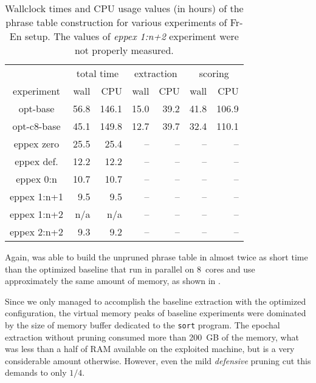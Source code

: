 \begin{table}[ht]
\centering
\begin{tabular}{ | c | r r | r r | r r | }
\hline
 & \multicolumn{2}{|c|}{total time} & \multicolumn{2}{|c|}{extraction} & \multicolumn{2}{|c|}{scoring} \\
experiment & wall & CPU & wall & CPU & wall & CPU \\
\hline
\hline
opt-base      & 56.8 & 146.1 & 15.0 & 39.2 & 41.8 & 106.9 \\
opt-c8-base   & 45.1 & 149.8 & 12.7 & 39.7 & 32.4 & 110.1 \\
eppex zero    & 25.5 &  25.4 & -- & -- & -- & -- \\
\hline
eppex def.    & 12.2 & 12.2 & -- & -- & -- & -- \\
eppex 0:n     & 10.7 & 10.7 & -- & -- & -- & -- \\
eppex 1:n+1   & 9.5 & 9.5 & -- & -- & -- & -- \\
eppex 1:n+2   & n/a & n/a & -- & -- & -- & -- \\
eppex 2:n+2   & 9.3 & 9.2 & -- & -- & -- & -- \\
\hline
\end{tabular}
\caption{\label{fr-en-time-benchmarks}
Wallclock times and CPU usage values (in hours) of the phrase table
construction for various experiments of Fr-En setup.
The values of \emph{eppex 1:n+2} experiment were not properly measured.}
\end{table}

Again, \eppex{} was able to build the unpruned phrase table in almost twice
as short time than the optimized baseline that run in parallel on 8~cores
and use approximately the same amount of memory, as shown in .

Since we only managed to accomplish the baseline extraction with the optimized
configuration, the virtual memory peaks of baseline experiments were dominated by
the size of memory buffer dedicated to the \texttt{sort} program.
The epochal extraction without pruning consumed more than 200~GB of the memory,
what was less than a half of RAM available on the exploited machine,
but is a very considerable amount otherwise.
However, even the mild \emph{defensive} pruning cut this demands to only $1/4$.

